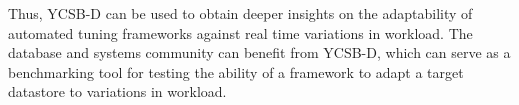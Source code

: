 \documentclass{vldb}
\begin{document}
 Thus, YCSB-D  can be used to obtain deeper insights on the adaptability of automated tuning frameworks against real time variations in workload.
  The database and systems community can benefit from YCSB-D, which can serve as a benchmarking tool for
  testing the ability of a framework to adapt a target datastore to variations in 
  workload. %
\end{document}
